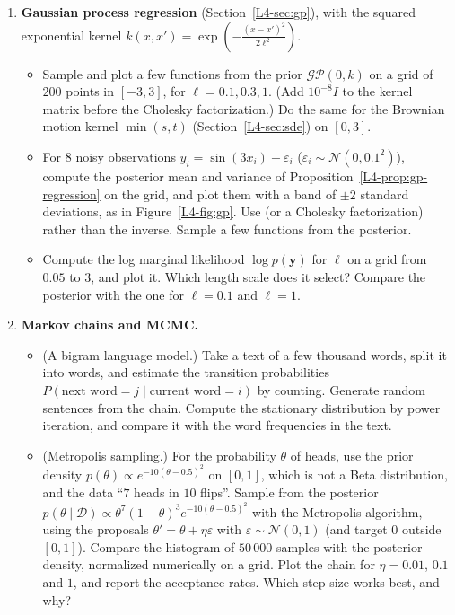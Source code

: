 \begin{enumerate}[label=\textbf{P\arabic*.}, leftmargin=*]
    \item \textbf{Gaussian process regression} (Section~\ref{L4-sec:gp}), with the squared exponential kernel $k(x, x') = \exp(-\frac{(x - x')^2}{2\ell^2})$.
    \begin{itemize}
        \item Sample and plot a few functions from the prior $\mathcal{GP}(0, k)$ on a grid of $200$ points in $[-3, 3]$, for $\ell = 0.1, 0.3, 1$. (Add $10^{-8}I$ to the kernel matrix before the Cholesky factorization.) Do the same for the Brownian motion kernel $\min(s, t)$ (Section~\ref{L4-sec:sde}) on $[0, 3]$.
        \item For $8$ noisy observations $y_i = \sin(3x_i) + \varepsilon_i$ ($\varepsilon_i \sim \mathcal{N}(0, 0.1^2)$), compute the posterior mean and variance of Proposition~\ref{L4-prop:gp-regression} on the grid, and plot them with a band of $\pm 2$ standard deviations, as in Figure~\ref{L4-fig:gp}. Use  (or a Cholesky factorization) rather than the inverse. Sample a few functions from the posterior.
        \item Compute the log marginal likelihood $\log p(\mathbf{y})$ for $\ell$ on a grid from $0.05$ to $3$, and plot it. Which length scale does it select? Compare the posterior with the one for $\ell = 0.1$ and $\ell = 1$.
    \end{itemize}

    \item \homework{} \textbf{Markov chains and MCMC.}
    \begin{itemize}
        \item (A bigram language model.) Take a text of a few thousand words, split it into words, and estimate the transition probabilities $P(\text{next word} = j \mid \text{current word} = i)$ by counting. Generate random sentences from the chain. Compute the stationary distribution by power iteration, and compare it with the word frequencies in the text.
        \item (Metropolis sampling.) For the probability $\theta$ of heads, use the prior density $p(\theta) \propto e^{-10(\theta - 0.5)^2}$ on $[0, 1]$, which is not a Beta distribution, and the data ``$7$ heads in $10$ flips''. Sample from the posterior $p(\theta \mid \mathcal{D}) \propto \theta^7(1 - \theta)^3 e^{-10(\theta - 0.5)^2}$ with the Metropolis algorithm, using the proposals $\theta' = \theta + \eta\varepsilon$ with $\varepsilon \sim \mathcal{N}(0, 1)$ (and target $0$ outside $[0, 1]$). Compare the histogram of $50\,000$ samples with the posterior density, normalized numerically on a grid. Plot the chain for $\eta = 0.01$, $0.1$ and $1$, and report the acceptance rates. Which step size works best, and why?
    \end{itemize}


\end{enumerate}
